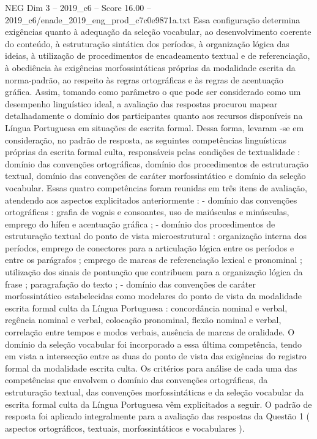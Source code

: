 \begin{textsample}{NEG Dim 3 – 2019\_c6 – Score 16.00 – 2019\_c6/enade\_2019\_eng\_prod\_c7c0e9871a.txt}
Essa configuração determina exigências quanto à adequação da seleção vocabular, ao desenvolvimento coerente do conteúdo, à estruturação sintática dos períodos, à organização lógica das ideias, à utilização de procedimentos de encadeamento textual e de referenciação, à obediência às exigências morfossintáticas próprias da modalidade escrita da norma-padrão, ao respeito às regras ortográficas e às regras de acentuação gráfica.
Assim, tomando como parâmetro o que pode ser considerado como um desempenho linguístico ideal, a avaliação das respostas procurou mapear detalhadamente o domínio dos participantes quanto aos recursos disponíveis na Língua Portuguesa em situações de escrita formal.
Dessa forma, levaram -se em consideração, no padrão de resposta, as seguintes competências linguísticas próprias da escrita formal culta, responsáveis pelas condições de textualidade : domínio das convenções ortográficas, domínio dos procedimentos de estruturação textual, domínio das convenções de caráter morfossintático e domínio da seleção vocabular.
Essas quatro competências foram reunidas em três itens de avaliação, atendendo aos aspectos explicitados anteriormente : - domínio das convenções ortográficas : grafia de vogais e consoantes, uso de maiúsculas e minúsculas, emprego do hífen e acentuação gráfica ; - domínio dos procedimentos de estruturação textual do ponto de vista microestrutural : organização interna dos períodos, emprego de conectores para a articulação lógica entre os períodos e entre os parágrafos ; emprego de marcas de referenciação lexical e pronominal ; utilização dos sinais de pontuação que contribuem para a organização lógica da frase ; paragrafação do texto ; - domínio das convenções de caráter morfossintático estabelecidas como modelares do ponto de vista da modalidade escrita formal culta da Língua Portuguesa : concordância nominal e verbal, regência nominal e verbal, colocação pronominal, flexão nominal e verbal, correlação entre tempos e modos verbais, ausência de marcas de oralidade.
O domínio da seleção vocabular foi incorporado a essa última competência, tendo em vista a intersecção entre as duas do ponto de vista das exigências do registro formal da modalidade escrita culta.
Os critérios para análise de cada uma das competências que envolvem o domínio das convenções ortográficas, da estruturação textual, das convenções morfossintáticas e da seleção vocabular da escrita formal culta da Língua Portuguesa vêm explicitados a seguir.
O padrão de resposta foi aplicado integralmente para a avaliação das respostas da Questão 1 ( aspectos ortográficos, textuais, morfossintáticos e vocabulares ).

\end{textsample}
